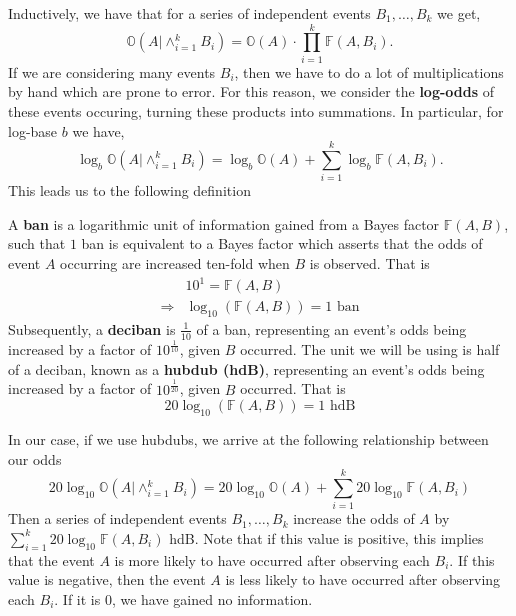   \noindent Inductively, we have that for a series of independent
  events $B_1, \dots, B_k$ we get,
  \[
    \mathbb{O}(A|\wedge_{i=1}^k B_i) =
    \mathbb{O}(A)\cdot\prod_{i=1}^k{\mathbb{F}(A,B_i)}.
  \]
  If we are considering many events $B_i$, then we have to do a lot
  of multiplications by hand which are prone to error. For this
  reason, we consider the {\bf{log-odds}} of these events occuring,
  turning these products into summations. In particular, for log-base $b$ we have,
  \[
    \log_b\mathbb{O}(A|\wedge_{i=1}^k B_i) =
    \log_b\mathbb{O}(A)+\sum_{i=1}^k{\log_b\mathbb{F}(A,B_i)}.
  \]
  This leads us to the following definition
  \begin{definition}
    A {\bf{ban}} is a logarithmic unit of information gained from a
    Bayes factor $\mathbb{F}(A,B)$, such that $1$ ban is equivalent to
    a Bayes factor which asserts that the odds of event $A$
    occurring are increased ten-fold when $B$ is observed. That is
    \begin{align*}
      & 10^1 = \mathbb{F}(A,B)                    \\
      \Rightarrow & \log_{10}(\mathbb{F}(A,B)) = 1\text{ ban}
    \end{align*}
    \noindent Subsequently, a {\bf{deciban}} is $\frac{1}{10}$ of a
    ban, representing an event's odds being increased by a factor of
    $10^\frac{1}{10}$, given $B$ occurred. The unit we will be using
    is half of a deciban, known as a {\bf{hubdub (hdB)}},
    representing an event's odds being increased by a factor of
    $10^\frac{1}{20}$, given $B$ occurred. That is
    \[
      20\log_{10}(\mathbb{F}(A,B)) = 1\text{ hdB}
    \]
  \end{definition}
  \noindent In our case, if we use hubdubs, we arrive at the
  following relationship between our odds
  \[
    20\log_{10}\mathbb{O}(A|\wedge_{i=1}^k B_i) =
    20\log_{10}\mathbb{O}(A)+\sum_{i=1}^k{20\log_{10}\mathbb{F}(A,B_i)}
  \]
  Then a series of independent events $B_1, \dots, B_k$ increase the
  odds of $A$ by  $\sum_{i=1}^k{20\log_{10}\mathbb{F}(A,B_i)}$ hdB.
  Note that if this value is positive, this implies that the event $A$
  is more likely to have occurred after observing each $B_i$. If this
  value is negative, then the event $A$ is less likely to have
  occurred after observing each $B_i$. If it is $0$, we have gained no
  information.

